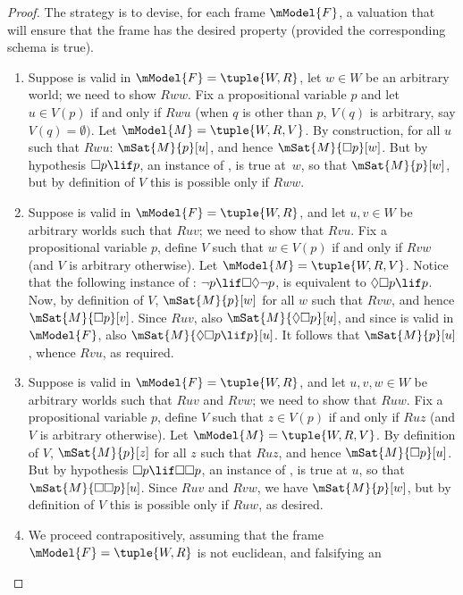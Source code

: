 \documentclass[../../../include/open-logic-section]{subfiles}
\begin{document}
\begin{proof}
  The strategy is to devise, for each frame $\mModel{F}$, a valuation
  that will ensure that the frame has the desired property (provided
  the corresponding schema is true).
  \begin{enumerate}
  \item Suppose  is valid in $\mModel{F} =\tuple{W, R}$, let $w \in W$ be
    an arbitrary world; we need to show $Rww$. Fix a propositional
    variable $p$ and let $u \in V(p)$ if and only if $Rwu$ (when $q$
    is other than $p$, $V(q)$ is arbitrary, say $V(q) =
    \emptyset)$. Let $\mModel{M}=\tuple{W, R, V}$. By construction,
    for all $u$ such that $Rwu$: $\mSat{M}{p}[u]$, and hence
    $\mSat{M}{\Box p}[w]$. But by hypothesis $\Box p \lif p$, an
    instance of , is true at~$w$, so that $\mSat{M}{p}[w]$, but
    by definition of $V$ this is possible only if $Rww$.
  \item Suppose  is valid in $\mModel{F}= \tuple{W,R}$, and let
    $u,v \in W$ be arbitrary worlds such that $Ruv$; we need to show
    that $Rvu$. Fix a propositional variable $p$, define $V$ such that
    $w \in V(p)$ if and only if $Rvw$ (and $V$ is arbitrary
    otherwise). Let $\mModel{M} =\tuple{W, R, V}$. Notice that the
    following instance of : $\lnot p \lif \Box\Diamond \lnot p$,
    is equivalent to $\Diamond \Box p \lif p$. Now, by definition of
    $V$, $\mSat{M}{p}[w]$ for all $w$ such that $Rvw$, and hence
    $\mSat{M}{\Box p}[v]$. Since $Ruv$, also $\mSat{M}{\Diamond\Box
      p}[u]$, and since  is valid in $\mModel{F}$, also
    $\mSat{M}{\Diamond\Box p \lif p}[u]$. It follows that
    $\mSat{M}{p}[u]$, whence $Rvu$, as required.
  \item Suppose  is valid in $\mModel{F} = \tuple{W,R}$, and let
    $u,v,w \in W$ be arbitrary worlds such that $Ruv$ and $Rvw$; we
    need to show that $Ruw$. Fix a propositional variable $p$, define
    $V$ such that $z \in V(p)$ if and only if $Ruz$ (and $V$ is
    arbitrary otherwise). Let $\mModel{M} =\tuple{W, R, V}$. By
    definition of $V$, $\mSat{M}{p}[z]$ for all $z$ such that $Ruz$,
    and hence $\mSat{M}{\Box p}[u]$. But by hypothesis $\Box p \lif
    \Box \Box p$, an instance of , is true at $u$, so that
    $\mSat{M}{\Box \Box p}[u]$. Since $Ruv$ and $Rvw$, we have
    $\mSat{M}{p}[w]$, but by definition of $V$ this is possible only
    if $Ruw$, as desired.
  \item We proceed contrapositively, assuming that the frame
    $\mModel{F} = \tuple{W, R}$ is not euclidean, and falsifying an

\end{enumerate}
\end{proof}
\end{document}
